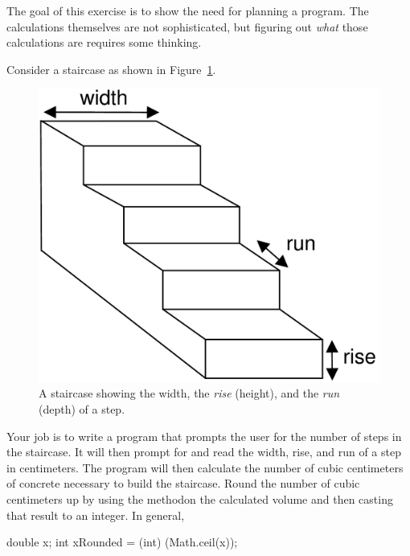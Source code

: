 \begin{exercise}
The goal of this exercise is to show the need for planning a program. The calculations themselves are not sophisticated, but figuring out {\em what} those calculations are requires some thinking.

Consider a staircase as shown in Figure~\ref{fig.staircase}.

\begin{figure}[!h]
\begin{center}
\includegraphics[scale=0.3]{figs/ch03/staircase.pdf}
\caption{A staircase showing the width, the {\em rise} (height), and the {\em run} (depth) of a step.}
\label{fig.staircase}
\end{center}
\end{figure}

Your job is to write a program that prompts the user for the number of steps in the staircase. It will then prompt for and read the width, rise, and run of a step in centimeters. The program will then calculate the number of cubic centimeters of concrete necessary to build the staircase. Round the number of cubic centimeters up by using the  method\footnotemark\space on the calculated volume and then casting that result to an integer.  In general,


\begin{code}
double x;
int xRounded = (int) (Math.ceil(x));
\end{code}


\end{exercise}
